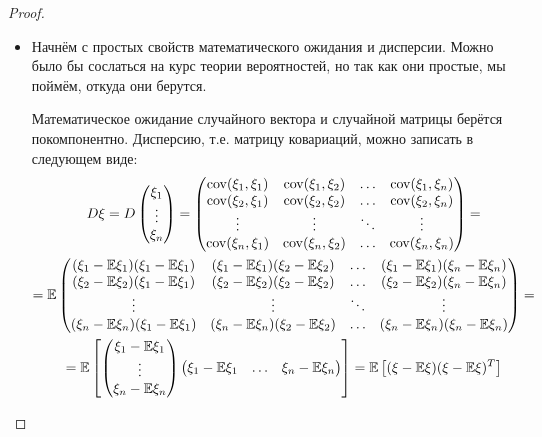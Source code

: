 \begin{proof}~
    \begin{itemize}
        \item Начнём с простых свойств математического ожидания и дисперсии. Можно было бы сослаться на курс теории вероятностей, но так как они простые, мы поймём, откуда они берутся.

        Математическое ожидание случайного вектора и случайной матрицы берётся покомпонентно. Дисперсию, т.е. матрицу ковариаций, можно записать в следующем виде:
        \begin{multline*}
            D\xi = D\begin{pmatrix}
                \xi_1 \\ \vdots \\ \xi_n
            \end{pmatrix} = \begin{pmatrix}
                \operatorname{cov}(\xi_1, \xi_1) & \operatorname{cov}(\xi_1, \xi_2) & \hdots & \operatorname{cov}(\xi_1, \xi_n) \\
                \operatorname{cov}(\xi_2, \xi_1) & \operatorname{cov}(\xi_2, \xi_2) & \hdots & \operatorname{cov}(\xi_2, \xi_n) \\
                \vdots & \vdots & \ddots & \vdots \\
                \operatorname{cov}(\xi_n, \xi_1) & \operatorname{cov}(\xi_n, \xi_2) & \hdots & \operatorname{cov}(\xi_n, \xi_n)              
            \end{pmatrix} =
            \\
            = \mathbb{E} \begin{pmatrix}
                (\xi_1-\mathbb{E}\xi_1)(\xi_1-\mathbb{E}\xi_1) & (\xi_1-\mathbb{E}\xi_1)(\xi_2-\mathbb{E}\xi_2) & \hdots & (\xi_1-\mathbb{E}\xi_1)(\xi_n-\mathbb{E}\xi_n) \\
                (\xi_2-\mathbb{E}\xi_2)(\xi_1-\mathbb{E}\xi_1) & (\xi_2-\mathbb{E}\xi_2)(\xi_2-\mathbb{E}\xi_2) & \hdots & (\xi_2-\mathbb{E}\xi_2)(\xi_n-\mathbb{E}\xi_n) \\
                \vdots & \vdots & \ddots & \vdots \\
                (\xi_n-\mathbb{E}\xi_n)(\xi_1-\mathbb{E}\xi_1) & (\xi_n-\mathbb{E}\xi_n)(\xi_2-\mathbb{E}\xi_2) & \hdots & (\xi_n-\mathbb{E}\xi_n)(\xi_n-\mathbb{E}\xi_n)
            \end{pmatrix} =
            \\
            = \mathbb{E} \left[\begin{pmatrix}
                \xi_1 - \mathbb{E} \xi_1 \\ \vdots \\ \xi_n - \mathbb{E}\xi_n
            \end{pmatrix} \begin{pmatrix}
                \xi_1 - \mathbb{E} \xi_1 & \hdots & \xi_n - \mathbb{E}\xi_n
            \end{pmatrix}\right] = \mathbb{E} \left[(\xi - \mathbb{E}\xi) (\xi - \mathbb{E}\xi)^T\right]
        \end{multline*}


\end{itemize}
\end{proof}
